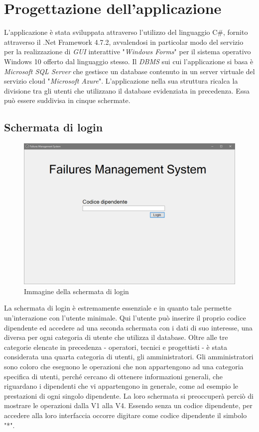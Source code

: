 \documentclass[a4paper, 12pt]{report}
\begin{document}
\chapter{Progettazione dell'applicazione}

L'applicazione è stata sviluppata attraverso l'utilizzo del linguaggio C\#, fornito attraverso il .Net Framework 4.7.2, avvalendosi in particolar modo del servizio per la realizzazione di \textit{GUI} interattive "\textit{Windows Forms}" per il sistema operativo Windows 10 offerto dal linguaggio stesso. Il \textit{DBMS} sui cui l'applicazione si basa è \textit{Microsoft SQL Server} che gestisce un database contenuto in un server virtuale del servizio cloud "\textit{Microsoft Azure}".\newline
L'applicazione nella sua struttura ricalca la divisione tra gli utenti che utilizzano il database evidenziata in precedenza. Essa può essere suddivisa in cinque schermate.

\section{Schermata di login}

\begin{figure}[H]
	\centering
	\includegraphics[width=\linewidth]{images/loginScreen.png}
	\caption{Immagine della schermata di login}
\end{figure}

La schermata di login è estremamente essenziale e in quanto tale permette un'interazione con l'utente minimale. Qui l'utente può inserire il proprio codice dipendente ed accedere
ad una seconda schermata con i dati di suo interesse, una diversa per ogni categoria di utente che utilizza il database. Oltre alle tre categorie elencate in precedenza - operatori,
tecnici e progettisti - è stata considerata una quarta categoria di utenti, gli amministratori. Gli amministratori sono coloro che eseguono le operazioni che non appartengono ad una
categoria specifica di utenti, perché cercano di ottenere informazioni generali, che riguardano i dipendenti che vi appartengono in generale, come ad esempio le prestazioni di ogni
singolo dipendente. La loro schermata si preoccuperà perciò di mostrare le operazioni dalla V1 alla V4. Essendo senza un codice dipendente, per accedere alla loro interfaccia
occorre digitare come codice dipendente il simbolo "*".
\end{document}
